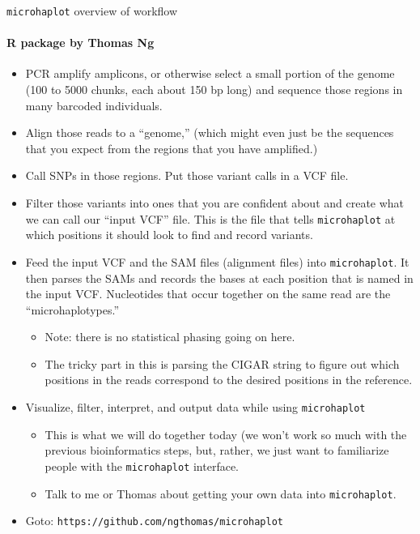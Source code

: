 \documentclass[letter,graphicx]{beamer}
\begin{document}
\begin{frame}{{\tt microhaplot} overview of workflow}
\framesubtitle{R package by Thomas Ng}

\begin{itemize}
\item PCR amplify amplicons, or otherwise select a small portion of the genome (100 to 5000 chunks, each about 150 bp long) and sequence those
regions in many barcoded individuals.
\item Align those reads to a ``genome,'' (which might even just be the sequences that you expect from the regions that you have amplified.)
\item Call SNPs in those regions.  Put those variant calls in a VCF file.
\item Filter those variants into ones that you are confident about and create what we can call
our ``input VCF'' file.  This is the file that tells {\tt microhaplot} at which positions it should look to
find and record variants.  

\end{itemize}
\end{frame}


\begin{frame}{}
\begin{itemize}
\item Feed the input VCF and the SAM files (alignment files) into {\tt microhaplot}.  It then parses the SAMs and records the bases at each position that is named in the input VCF.  Nucleotides that occur together
on the same read are the ``microhaplotypes.'' 
\begin{itemize}
 \item Note: there is no statistical phasing going on here.
 \item The tricky part in this is parsing the CIGAR string to figure out which positions in the reads
 correspond to the desired positions in the reference.
\end{itemize}

\item Visualize, filter, interpret, and output data while using {\tt microhaplot}
\begin{itemize}
\item This is what we will do together today (we won't work so much with the previous bioinformatics steps,
but, rather, we just want to familiarize people with the {\tt microhaplot} interface.  
\item Talk to me or Thomas about getting your own data into {\tt microhaplot}.
\end{itemize}

\item Goto: {\tt https://github.com/ngthomas/microhaplot}

\end{itemize}


\end{frame}
\end{document}
